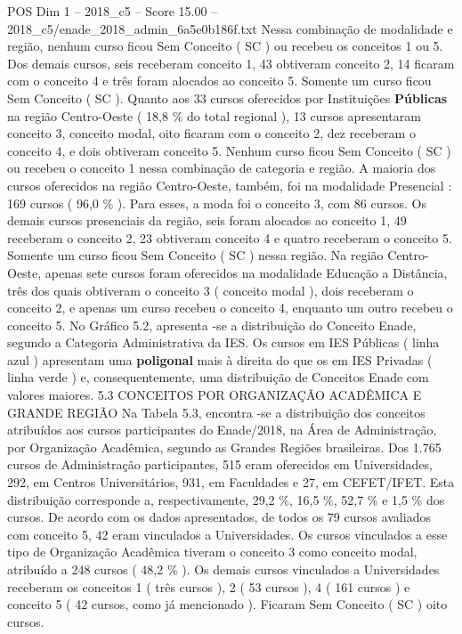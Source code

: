 \begin{textsample}{POS Dim 1 – 2018\_c5 – Score 15.00 – 2018\_c5/enade\_2018\_admin\_6a5e0b186f.txt}
Nessa combinação de modalidade e região, nenhum curso ficou Sem Conceito ( SC ) ou recebeu os conceitos 1 ou 5.
Dos demais cursos, seis receberam conceito 1, 43 obtiveram conceito 2, 14 ficaram com o conceito 4 e três foram alocados ao conceito 5.
Somente um curso ficou Sem Conceito ( SC ).
Quanto aos 33 cursos oferecidos por Instituições \textbf{Públicas} na região Centro-Oeste ( 18,8 \% do total regional ), 13 cursos apresentaram conceito 3, conceito modal, oito ficaram com o conceito 2, dez receberam o conceito 4, e dois obtiveram conceito 5.
Nenhum curso ficou Sem Conceito ( SC ) ou recebeu o conceito 1 nessa combinação de categoria e região.
A maioria dos cursos oferecidos na região Centro-Oeste, também, foi na modalidade Presencial : 169 cursos ( 96,0 \% ).
Para esses, a moda foi o conceito 3, com 86 cursos.
Os demais cursos presenciais da região, seis foram alocados ao conceito 1, 49 receberam o conceito 2, 23 obtiveram conceito 4 e quatro receberam o conceito 5.
Somente um curso ficou Sem Conceito ( SC ) nessa região.
Na região Centro-Oeste, apenas sete cursos foram oferecidos na modalidade Educação a Distância, três dos quais obtiveram o conceito 3 ( conceito modal ), dois receberam o conceito 2, e apenas um curso recebeu o conceito 4, enquanto um outro recebeu o conceito 5.
No Gráfico 5.2, apresenta -se a distribuição do Conceito Enade, segundo a Categoria Administrativa da IES.
Os cursos em IES Públicas ( linha azul ) apresentam uma \textbf{poligonal} mais à direita do que os em IES Privadas ( linha verde ) e, consequentemente, uma distribuição de Conceitos Enade com valores maiores. 5.3 CONCEITOS POR ORGANIZAÇÃO ACADÊMICA E GRANDE REGIÃO Na Tabela 5.3, encontra -se a distribuição dos conceitos atribuídos aos cursos participantes do Enade/2018, na Área de Administração, por Organização Acadêmica, segundo as Grandes Regiões brasileiras.
Dos 1.765 cursos de Administração participantes, 515 eram oferecidos em Universidades, 292, em Centros Universitários, 931, em Faculdades e 27, em CEFET/IFET.
Esta distribuição corresponde a, respectivamente, 29,2 \%, 16,5 \%, 52,7 \% e 1,5 \% dos cursos.
De acordo com os dados apresentados, de todos os 79 cursos avaliados com conceito 5, 42 eram vinculados a Universidades.
Os cursos vinculados a esse tipo de Organização Acadêmica tiveram o conceito 3 como conceito modal, atribuído a 248 cursos ( 48,2 \% ).
Os demais cursos vinculados a Universidades receberam os conceitos 1 ( três cursos ), 2 ( 53 cursos ), 4 ( 161 cursos ) e conceito 5 ( 42 cursos, como já mencionado ).
Ficaram Sem Conceito ( SC ) oito cursos.

\end{textsample}
